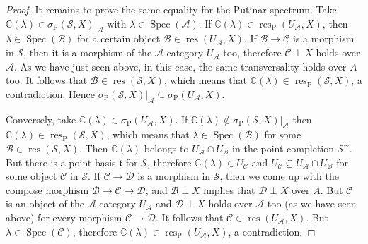 \documentclass[12pt]{amsart}%
\theoremstyle{plain}
\numberwithin{equation}{section}
\numberwithin{equation}{section}
\numberwithin{theorem}{section}
\numberwithin{lemma}{section}
\numberwithin{remark}{section}
\numberwithin{example}{section}
\numberwithin{proposition}{section}
\numberwithin{definition}{section}
\numberwithin{corollary}{section}
\begin{document}
\begin{proof}
It remains to prove the same equality for the Putinar spectrum. Take
$\mathbb{C}\left(  \lambda\right)  \in\sigma_{\operatorname{P}}\left(
\mathcal{S},X\right)  |_{\mathcal{A}}$ with $\lambda\in\operatorname{Spec}%
\left(  \mathcal{A}\right)  $. If $\mathbb{C}\left(  \lambda\right)
\in\operatorname{res}_{\operatorname{P}}\left(  U_{\mathcal{A}},X\right)  $,
then $\lambda\in\operatorname{Spec}\left(  \mathcal{B}\right)  $ for a certain
object $\mathcal{B}\in\operatorname{res}\left(  U_{\mathcal{A}},X\right)  $.
If $\mathcal{B\rightarrow C}$ is a morphism in $\mathcal{S}$, then it is a
morphism of the $\mathcal{A}$-category $U_{\mathcal{A}}$ too, therefore
$\mathcal{C}\perp X$ holds over $\mathcal{A}$. As we have just seen above, in
this case, the same transversality holds over $A$ too. It follows that
$\mathcal{B}\in\operatorname{res}\left(  \mathcal{S},X\right)  $, which means
that $\mathbb{C}\left(  \lambda\right)  \in\operatorname{res}%
_{\operatorname{P}}\left(  \mathcal{S},X\right)  $, a contradiction. Hence
$\sigma_{\operatorname{P}}\left(  \mathcal{S},X\right)  |_{\mathcal{A}%
}\subseteq\sigma_{\operatorname{P}}\left(  U_{\mathcal{A}},X\right)  $.

Conversely, take $\mathbb{C}\left(  \lambda\right)  \in\sigma
_{\operatorname{P}}\left(  U_{\mathcal{A}},X\right)  $. If $\mathbb{C}\left(
\lambda\right)  \notin\sigma_{\operatorname{P}}\left(  \mathcal{S},X\right)
|_{\mathcal{A}}$ then $\mathbb{C}\left(  \lambda\right)  \in\operatorname{res}%
_{\operatorname{P}}\left(  \mathcal{S},X\right)  $, which means that
$\lambda\in\operatorname{Spec}\left(  \mathcal{B}\right)  $ for some
$\mathcal{B\in}\operatorname{res}\left(  \mathcal{S},X\right)  $. Then
$\mathbb{C}\left(  \lambda\right)  $ belongs to $U_{\mathcal{A}}\cap
U_{\mathcal{B}}$ in the point completion $\mathcal{S}^{\sim}$. But there is a
point basis $\mathfrak{t}$ for $\mathcal{S}$, therefore $\mathbb{C}\left(
\lambda\right)  \in U_{\mathcal{C}}$ and $U_{\mathcal{C}}\subseteq
U_{\mathcal{A}}\cap U_{\mathcal{B}}$ for some object $\mathcal{C}$ in
$\mathcal{S}$. If $\mathcal{C\rightarrow D}$ is a morphism in $\mathcal{S}$,
then we come up with the compose morphism $\mathcal{B\rightarrow C\rightarrow
D}$, and $\mathcal{B}\perp X$ implies that $\mathcal{D}\perp X$ over $A$. But
$\mathcal{C}$ is an object of the $\mathcal{A}$-category $U_{\mathcal{A}}$ and
$\mathcal{D}\perp X$ holds over $\mathcal{A}$ too (as we have seen above) for
every morphism $\mathcal{C\rightarrow D}$. It follows that $\mathcal{C\in
}\operatorname{res}\left(  U_{\mathcal{A}},X\right)  $. But $\lambda
\in\operatorname{Spec}\left(  \mathcal{C}\right)  $, therefore $\mathbb{C}%
\left(  \lambda\right)  \in\operatorname{res}_{\operatorname{P}}\left(
U_{\mathcal{A}},X\right)  $, a contradiction.
\end{proof}
\end{document}
